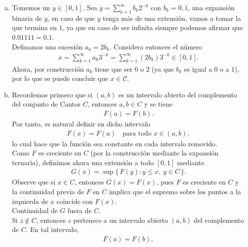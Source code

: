 \begin{solucion}
\begin{enumerate}[a)]
      Para probar que $F(0)=0$ solo hay que recordar que la expansión de $0$ es nula en todas sus componentes, por lo que es claro que $F(0)=0$. Por otro lado para $x=1$, se tiene que su representación ternaria es $2 en cada componente$, por lo que $b_{k}=1$ en cada componente y por ende $F(1)=1$.
    \item Tomemos un $y\in [0,1]$. Sea $y=\sum_{k=1}^{\infty}b_{k}2^{-k}$ con $b_{k}=0,1$, una expansión binaria de $y$, en caso de que $y$ tenga más de una extensión, vamos a tomar la que termina en $1$, ya que en caso de ser infinita siempre podemos afirmar que $0.01111=0.1$.\\
      Definamos una sucesión $a_{k}=2b_{k}$. Considera entonces el número
      \begin{align*}
        x=\sum_{k=1}^{\infty}a_{k}3^{-k}=\sum_{k=1}^{\infty}(2b_{k})3^{-k}\in [0,1].
      \end{align*}
      Ahora, por construcción $a_{k}$ tiene que ser $0$ o $2$ (ya que $b_{k}$ es igual a $0$ o a $1$), por lo que se puede concluir que $x\in\mathcal{C}$.
    \item Recordemos primero que si $(a,b)$ es un intervalo abierto del complemento del conjunto de Cantor $C$, entonces $a,b\in C$ y se tiene
      \begin{align}
        F(a)=F(b).
      \end{align}
      Por tanto, es natural definir en dicho intervalo
      \begin{align*}
        F(x)=F(a)\quad \text{para todo } x\in(a,b),       
      \end{align*}
      lo cual hace que la función sea constante en cada intervalo removido.\\
      Como $F$ es creciente en $C$ (por la construcción mediante la expansión ternaria), definimos ahora una extensión a todo $[0,1]$ mediante
      \begin{align*}
        G(x)=\sup\{\,F(y): y\le x,\ y\in C\,\}.       
      \end{align*}
      Observe que si $x\in C$, entonces $G(x)=F(x)$, pues $F$ es creciente en $C$ y la continuidad previa de $F$ en $C$ implica que el supremo sobre los puntos a la izquierda de $x$ coincide con $F(x)$.\\
      Continuidad de $G$ fuera de $C$.\\
      Si $z\notin C$, entonces $z$ pertenece a un intervalo abierto $(a,b)$ del complemento de $C$. En tal intervalo,
      \begin{align*}
        F(a)=F(b),       

\end{align*}
\end{enumerate}
\end{solucion}
